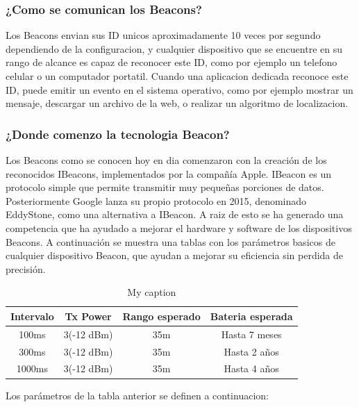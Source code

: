 \subsubsection{¿Como se comunican los Beacons?}

Los Beacons envian sus ID unicos aproximadamente 10 veces por segundo dependiendo de la configuracion, y cualquier dispositivo que se encuentre en su rango de alcance es capaz de reconocer este ID, como por ejemplo un telefono celular o un computador portatil. Cuando una aplicacion dedicada reconoce este ID, puede emitir un evento en el sistema operativo, como por ejemplo mostrar un mensaje, descargar un archivo de la web, o realizar un algoritmo de localizacion.

\subsubsection{¿Donde comenzo la tecnologia Beacon?}

Los Beacons como se conocen hoy en dia comenzaron con la creación de los reconocidos IBeacons, implementados por la compañía Apple. IBeacon es un protocolo simple que permite transmitir muy pequeñas porciones de datos. Posteriormente Google lanza su propio protocolo en 2015, denominado EddyStone, como una alternativa a IBeacon. A raiz de esto se ha generado una competencia que ha ayudado a mejorar el hardware y software de los dispositivos Beacons. A continuación se muestra una tablas con los parámetros basicos de cualquier dispositivo Beacon, que ayudan a mejorar su eficiencia sin perdida de precisión.

\begin{table}[]
\centering
\caption{My caption}
\label{my-label}
\begin{tabular}{|c|c|c|c|}
\hline
Intervalo & Tx Power   & Rango esperado & Bateria esperada \\ \hline
100ms     & 3(-12 dBm) & 35m            & Hasta 7 meses    \\ \hline
300ms     & 3(-12 dBm) & 35m            & Hasta 2 años     \\ \hline
1000ms    & 3(-12 dBm) & 35m            & Hasta 4 años     \\ \hline
\end{tabular}
\end{table}

Los parámetros de la tabla anterior se definen a continuacion:

